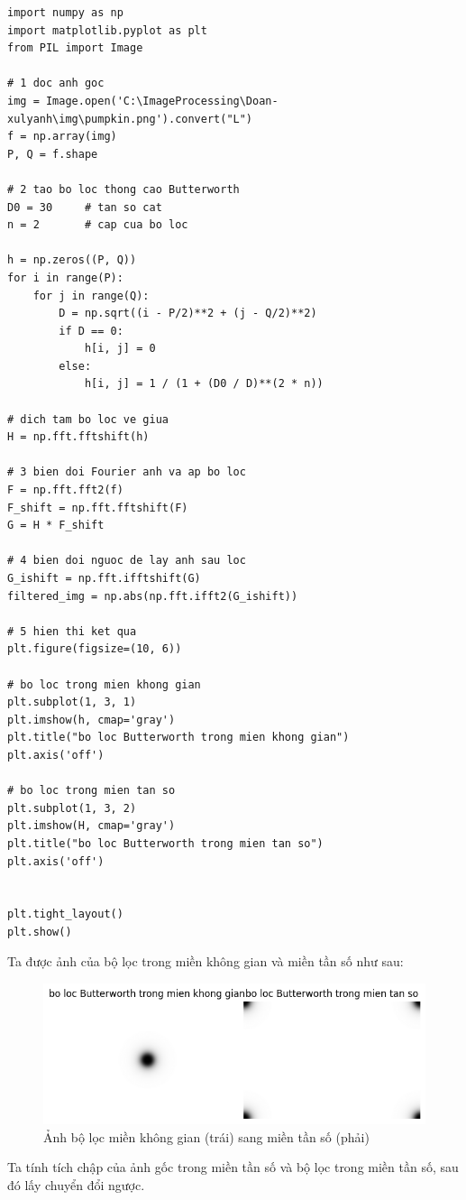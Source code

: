 \documentclass[12pt,a4paper]{report}
\numberwithin{equation}{section}
\theoremstyle{definition} %
\begin{document}
\begin{lstlisting}
import numpy as np
import matplotlib.pyplot as plt
from PIL import Image

# 1 doc anh goc
img = Image.open('C:\ImageProcessing\Doan-xulyanh\img\pumpkin.png').convert("L")
f = np.array(img)
P, Q = f.shape

# 2 tao bo loc thong cao Butterworth
D0 = 30     # tan so cat
n = 2       # cap cua bo loc

h = np.zeros((P, Q))
for i in range(P):
    for j in range(Q):
        D = np.sqrt((i - P/2)**2 + (j - Q/2)**2)
        if D == 0:
            h[i, j] = 0
        else:
            h[i, j] = 1 / (1 + (D0 / D)**(2 * n))

# dich tam bo loc ve giua
H = np.fft.fftshift(h)

# 3 bien doi Fourier anh va ap bo loc
F = np.fft.fft2(f)
F_shift = np.fft.fftshift(F)
G = H * F_shift

# 4 bien doi nguoc de lay anh sau loc
G_ishift = np.fft.ifftshift(G)
filtered_img = np.abs(np.fft.ifft2(G_ishift))

# 5 hien thi ket qua
plt.figure(figsize=(10, 6))

# bo loc trong mien khong gian
plt.subplot(1, 3, 1)
plt.imshow(h, cmap='gray')
plt.title("bo loc Butterworth trong mien khong gian")
plt.axis('off')

# bo loc trong mien tan so
plt.subplot(1, 3, 2)
plt.imshow(H, cmap='gray')
plt.title("bo loc Butterworth trong mien tan so")
plt.axis('off')


plt.tight_layout()
plt.show()

\end{lstlisting}

Ta được ảnh của bộ lọc trong miền không gian và miền tần số như sau:
\begin{figure}[H]
\centering
\includegraphics[width=0.8\linewidth]{img/butterworthhighpass/bolocKG-TS.png}
\caption{Ảnh bộ lọc miền không gian (trái) sang miền tần số (phải)}
\end{figure}
Ta tính tích chập của ảnh gốc trong miền tần số và bộ lọc trong miền tần số, sau đó lấy chuyển đổi ngược. 
\end{document}
